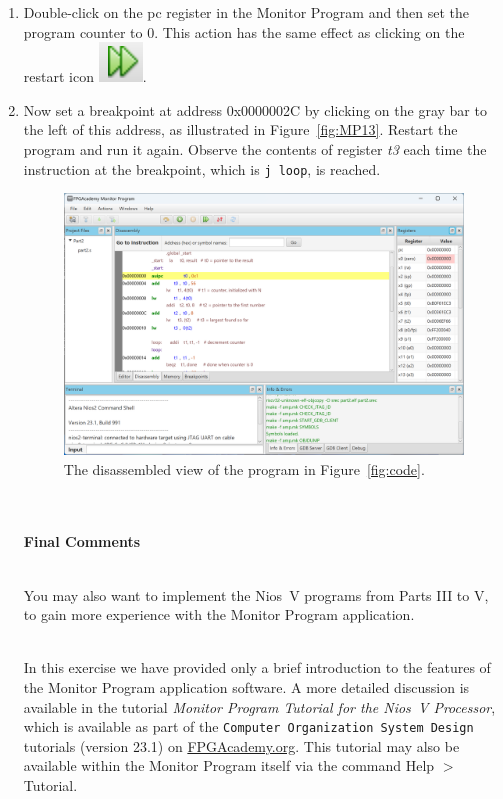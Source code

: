 \documentclass[epsfig,10pt,fullpage]{article}
\begin{document}
\begin{enumerate}
\item Double-click on the {\sf pc} register in the Monitor Program and then set the program
counter to 0. This action has the same effect as
clicking on the restart icon \hbox{\includegraphics[scale=0.4]{figures/restart.png}}. 

\item Now set a breakpoint at address {\sf 0x0000002C} by clicking on the gray bar to
the left of this address, as illustrated in Figure~\ref{fig:MP13}. Restart the program and run 
it again.  Observe the contents of register {\it t3} each time the instruction at the
breakpoint, which is \texttt{j loop}, is reached.

\begin{figure}[H]
	\begin{center}
	\includegraphics[scale=0.33]{figures/Part2.png}
	\end{center}
	\caption{The disassembled view of the program in Figure~\ref{fig:code}.}
\label{fig:MP11}
\end{figure}

~\\
~\\
{\bf Final Comments}

~\\
\noindent
You may also want to implement the Nios~V programs from Parts III to V, to gain more
experience with the Monitor Program application.

~\\
\noindent
In this exercise we
have provided only a brief introduction to the features of the Monitor Program
application software. A more detailed discussion is 
available in the tutorial {\it Monitor Program Tutorial for the Nios~V Processor}, 
which is available as part of the 
\texttt{Computer Organization System Design} tutorials (version 23.1) on
{\small \href{https://www.fpgacademy.org/tutorials.html} {FPGAcademy.org}}.
This tutorial may also be available within the Monitor Program itself via the command
{\sf Help $>$ Tutorial}.


\end{enumerate}
\end{document}
